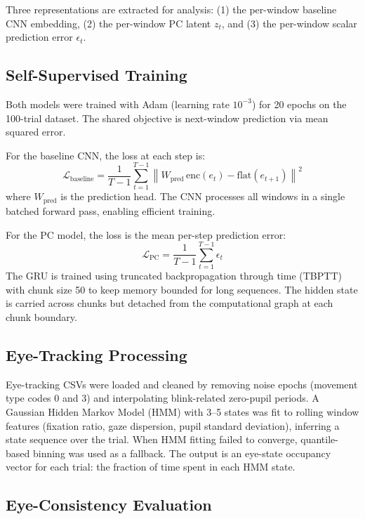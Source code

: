 \documentclass[11pt, letterpaper]{article}
\begin{document}
Three representations are extracted for analysis: (1) the per-window baseline CNN
embedding, (2) the per-window PC latent $z_t$, and (3) the per-window scalar prediction
error $\epsilon_t$.

\subsection{Self-Supervised Training}

Both models were trained with Adam (learning rate $10^{-3}$) for 20 epochs on the
100-trial dataset. The shared objective is next-window prediction via mean squared error.

For the baseline CNN, the loss at each step is:
\begin{equation}
  \mathcal{L}_{\text{baseline}} = \frac{1}{T-1}\sum_{t=1}^{T-1} \left\| W_{\text{pred}}\,\text{enc}(e_t) - \text{flat}(e_{t+1}) \right\|^2
\end{equation}
where $W_{\text{pred}}$ is the prediction head. The CNN processes all windows in a
single batched forward pass, enabling efficient training.

For the PC model, the loss is the mean per-step prediction error:
\begin{equation}
  \mathcal{L}_{\text{PC}} = \frac{1}{T-1}\sum_{t=1}^{T-1} \epsilon_t
\end{equation}
The GRU is trained using truncated backpropagation through time (TBPTT) with chunk
size 50 to keep memory bounded for long sequences. The hidden state is carried across
chunks but detached from the computational graph at each chunk boundary.

\subsection{Eye-Tracking Processing}

Eye-tracking CSVs were loaded and cleaned by removing noise epochs (movement type
codes 0 and 3) and interpolating blink-related zero-pupil periods. A Gaussian Hidden
Markov Model (HMM) with 3--5 states was fit to rolling window features (fixation ratio,
gaze dispersion, pupil standard deviation), inferring a state sequence over the trial.
When HMM fitting failed to converge, quantile-based binning was used as a fallback.
The output is an eye-state occupancy vector for each trial: the fraction of time spent
in each HMM state.

\subsection{Eye-Consistency Evaluation}
\end{document}
